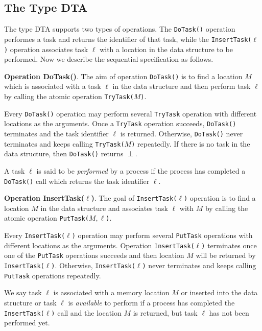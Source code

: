 \subsection{The Type DTA}

The type DTA supports two types of operations. The \texttt{DoTask()} operation performes a task
and returns the identifier of that task, while the \texttt{InsertTask(}$\ell$\texttt{)} operation associates task
$\ell$ with a location in the data structure to be performed. Now we describe the sequential specification
as follows.

\textbf{Operation DoTask()}.
The aim of operation \texttt{DoTask()} is to find a location $M$ which is associated with a task
$\ell$ in the data structure and then perform task $\ell$ by calling the atomic operation \texttt{TryTask(}$M$\texttt{)}.

Every \texttt{DoTask()} operation may perform several \texttt{TryTask} operation with different locations as the
arguments. Once a \texttt{TryTask} operation succeeds, \texttt{DoTask()} terminates and
the task identifier $\ell$ is returned. Otherwise, \texttt{DoTask()} never terminates and keeps calling
\texttt{TryTask(}$M$\texttt{)} repeatedly. If there is no task in the data structure,
then \texttt{DoTask()} returns $\perp$.

A task $\ell$ is said to be \emph{performed} by a process if the process has completed a \texttt{DoTask()} call
which returns the task identifier $\ell$.

\textbf{Operation InsertTask($\ell$)}.
The goal of \texttt{InsertTask(}$\ell$\texttt{)} operation is to find a location $M$ in the data structure and
associates task $\ell$ with $M$ by calling the atomic operation \texttt{PutTask(}$M,\ell$\texttt{)}.

Every \texttt{InsertTask(}$\ell$\texttt{)} operation may perform several \texttt{PutTask} operations with
different locations as the arguments. Operation \texttt{InsertTask(}$\ell$\texttt{)} terminates once one of the
\texttt{PutTask} operations succeeds and then location $M$ will be returned by \texttt{InsertTask(}$\ell$\texttt{)}.
Otherwise, \texttt{InsertTask(}$\ell$\texttt{)} never terminates and keeps
calling \texttt{PutTask} operations repeatedly.

We say task $\ell$ is associated with a memory location $M$ or inserted into the data structure or task $\ell$
is \emph{available} to perform if a process has completed the \texttt{InsertTask(}$\ell$\texttt{)} call and the location
$M$ is returned, but task $\ell$ has not been performed yet.



